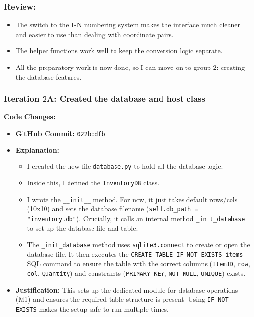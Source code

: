 \subsubsection{Review:}
\begin{itemize}
	\item The switch to the 1-N numbering system makes the interface much cleaner and easier to use than dealing with coordinate pairs.
	\item The helper functions work well to keep the conversion logic separate.
	\item All the preparatory work is now done, so I can move on to group 2: creating the database features.
\end{itemize}

\newpage

\subsubsection{Iteration 2A: Created the database and host class}

\textbf{Code Changes:}
\begin{itemize}
	\item \textbf{GitHub Commit:} \verb|022bcdfb|
	\item \textbf{Explanation:}
	\begin{itemize}
		\item I created the new file \verb|database.py| to hold all the database logic.
		\item Inside this, I defined the \verb|InventoryDB| class.
		\item I wrote the \verb|__init__| method. For now, it just takes default rows/cols (10x10) and sets the database filename (\verb|self.db_path = "inventory.db"|). Crucially, it calls an internal method \verb|_init_database| to set up the database file and table.
		\item The \verb|_init_database| method uses \verb|sqlite3.connect| to create or open the database file. It then executes the \verb|CREATE TABLE IF NOT EXISTS items| SQL command to ensure the table with the correct columns (\verb|ItemID|, \verb|row|, \verb|col|, \verb|Quantity|) and constraints (\verb|PRIMARY KEY|, \verb|NOT NULL|, \verb|UNIQUE|) exists.
	\end{itemize}
	\item \textbf{Justification:} This sets up the dedicated module for database operations (M1) and ensures the required table structure is present. Using \verb|IF NOT EXISTS| makes the setup safe to run multiple times.
\end{itemize}


